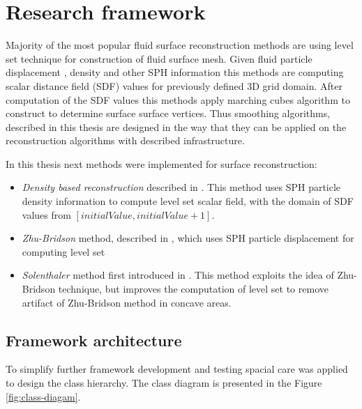 \chapter{Research framework}
Majority of the most popular fluid surface reconstruction methods are using level set technique for construction of fluid surface mesh. Given fluid particle displacement , density and other SPH information this methods are computing scalar distance field (SDF) values for previously defined 3D grid domain. After computation of the SDF values this methods apply marching cubes algorithm to construct to determine surface surface vertices.
Thus  smoothing algorithms, described in this thesis are designed in the way that they can be applied on the reconstruction algorithms with described infrastructure.


In this thesis next methods were implemented for surface reconstruction:
\begin{itemize}
  \item \emph{Density based reconstruction} described in \cite{DencRec}. This method uses SPH particle density information to compute level set scalar field, with the domain of SDF values from $[initialValue, initialValue+1]$.
  \item \emph{Zhu-Bridson} method, described in \cite{ZhuBridson}, which uses SPH particle displacement for computing level set
  \item \emph{Solenthaler} method first introduced in \cite{Solenthaler}. This method exploits the idea of Zhu-Bridson technique, but improves the computation of level set to remove artifact of Zhu-Bridson method in concave areas.
\end{itemize}



\section{Framework architecture}
To simplify further framework development and testing spacial care was applied to design the class hierarchy. The class diagram is presented in the Figure \ref{fig:class-diagam}.

